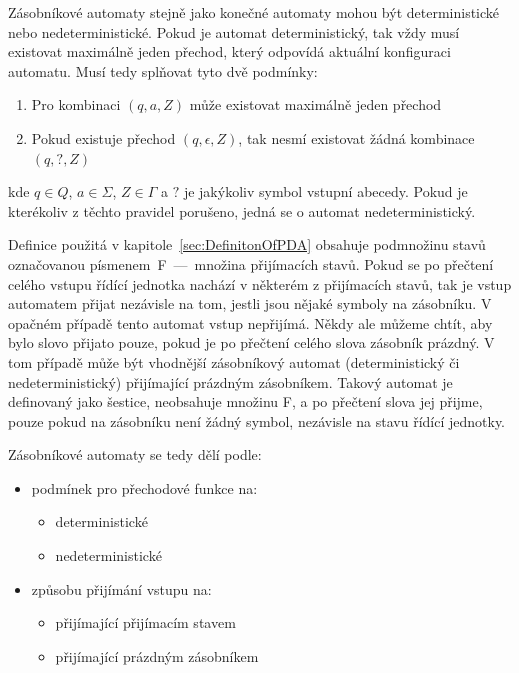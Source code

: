 Zásobníkové automaty stejně jako konečné automaty mohou být deterministické nebo nedeterministické. Pokud je automat deterministický, tak vždy musí existovat maximálně jeden přechod, který odpovídá aktuální konfiguraci automatu. Musí tedy splňovat tyto dvě podmínky:
\begin{enumerate}
    \item Pro kombinaci $(q,a,Z)$ může existovat maximálně jeden přechod
    \item Pokud existuje přechod $(q,\epsilon,Z)$, tak nesmí existovat žádná kombinace $(q,\mathord{?},Z)$
\end{enumerate}
kde $q \in Q$, $a \in \Sigma$, $Z \in \Gamma$ a $\mathord{?}$ je jakýkoliv symbol vstupní abecedy. Pokud je kterékoliv z těchto pravidel porušeno, jedná se o automat nedeterministický.

Definice použitá v kapitole~\ref{sec:DefinitonOfPDA} obsahuje podmnožinu stavů označovanou písmenem~F~---~množina přijímacích stavů. Pokud se po přečtení celého vstupu řídící jednotka nachází v některém z přijímacích stavů, tak je vstup automatem přijat nezávisle na tom, jestli jsou nějaké symboly na zásobníku. V opačném případě tento automat vstup nepřijímá. Někdy ale můžeme chtít, aby bylo slovo přijato pouze, pokud je po přečtení celého slova zásobník prázdný. V tom případě může být vhodnější zásobníkový automat (deterministický či nedeterministický) přijímající prázdným zásobníkem. Takový automat je definovaný jako šestice, neobsahuje množinu F, a po přečtení slova jej přijme, pouze pokud na zásobníku není žádný symbol, nezávisle na stavu řídící jednotky.

Zásobníkové automaty se tedy dělí podle:
\begin{itemize}
    \item podmínek pro přechodové funkce na:
        \begin{itemize}
            \item deterministické
            \item nedeterministické
        \end{itemize}
    \item způsobu přijímání vstupu na:
        \begin{itemize}
            \item přijímající přijímacím stavem
            \item přijímající prázdným zásobníkem
        \end{itemize}
\end{itemize}

